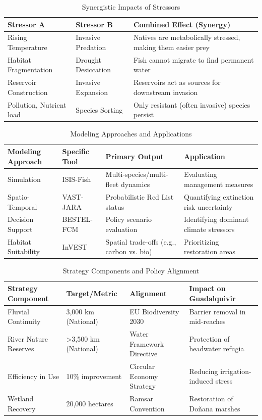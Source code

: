 \documentclass[11pt,a4paper]{article}
\begin{document}
{\begin{table}[h!]
\centering
\caption{Synergistic Impacts of Stressors}
\begin{tabular}{p{3.5cm} p{3.5cm} p{6cm}}
\toprule
\textbf{Stressor A} & \textbf{Stressor B} & \textbf{Combined Effect (Synergy)} \\
\midrule
Rising Temperature & Invasive Predation & Natives are metabolically stressed, making them easier prey \\
\midrule
Habitat Fragmentation & Drought Desiccation & Fish cannot migrate to find permanent water \\
\midrule
Reservoir Construction & Invasive Expansion & Reservoirs act as sources for downstream invasion \\
\midrule
Pollution, Nutrient load & Species Sorting & Only resistant (often invasive) species persist \\
\bottomrule
\end{tabular}
\end{table}

\begin{table}[h!]
\centering
\caption{Modeling Approaches and Applications}
\begin{tabular}{p{3cm} p{2.5cm} p{4cm} p{4cm}}
\toprule
\textbf{Modeling Approach} & \textbf{Specific Tool} & \textbf{Primary Output} & \textbf{Application} \\
\midrule
Simulation & ISIS-Fish & Multi-species/multi-fleet dynamics & Evaluating management measures \\
\midrule
Spatio-Temporal & VAST-JARA & Probabilistic Red List status & Quantifying extinction risk uncertainty \\
\midrule
Decision Support & BESTEL-FCM & Policy scenario evaluation & Identifying dominant climate stressors \\
\midrule
Habitat Suitability & InVEST & Spatial trade-offs (e.g., carbon vs. bio) & Prioritizing restoration areas \\
\bottomrule
\end{tabular}
\end{table}

\begin{table}[h!]
\centering
\caption{Strategy Components and Policy Alignment}
\begin{tabular}{p{3.5cm} p{3.5cm} p{3.5cm} p{3.5cm}}
\toprule
\textbf{Strategy Component} & \textbf{Target/Metric} & \textbf{Alignment} & \textbf{Impact on Guadalquivir} \\
\midrule
Fluvial Continuity & 3,000 km (National) & EU Biodiversity 2030 & Barrier removal in mid-reaches \\
\midrule
River Nature Reserves & >3,500 km (National) & Water Framework Directive & Protection of headwater refugia \\
\midrule
Efficiency in Use & 10\% improvement & Circular Economy Strategy & Reducing irrigation-induced stress \\
\midrule
Wetland Recovery & 20,000 hectares & Ramsar Convention & Restoration of Doñana marshes \\
\bottomrule
\end{tabular}
\end{table}

}
\end{document}
